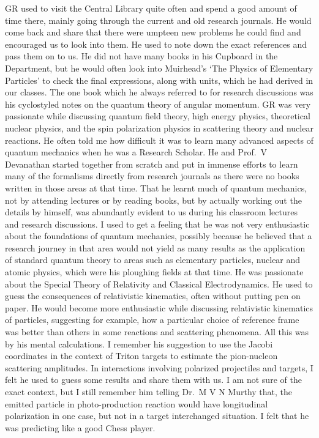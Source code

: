 GR used to visit the Central Library quite often and spend a good amount of time there, mainly going through the current and old research journals. He would come back and share that there were umpteen new problems he could find and encouraged us to look into them. He used to note down the exact references and pass them on to us. He did not have many books in his Cupboard in the Department, but he would often look into Muirhead's ‘The Physics of Elementary Particles' to check the final expressions, along with units, which he had derived in our classes. The one book which he always referred to for research discussions was his cyclostyled notes on the quantum theory of angular momentum. GR was very passionate while discussing quantum field theory, high energy physics, theoretical nuclear physics, and the spin polarization physics in scattering theory and nuclear reactions. He often told me how difficult it was to learn many advanced aspects of quantum mechanics when he was a Research Scholar. He and Prof.\ V Devanathan started together from scratch and put in immense efforts to learn many of the formalisms directly from research journals as there were no books written in those areas at that time. That he learnt much of quantum mechanics, not by attending lectures or by reading books, but by actually working out the details by himself, was abundantly evident to us during his classroom lectures and research discussions. I used to get a feeling that he was not very enthusiastic about the foundations of quantum mechanics, possibly because he believed that a research journey in that area would not yield as many results as the application of standard quantum theory to areas such as elementary particles, nuclear and atomic physics, which were his ploughing fields at that time. He was passionate about the Special Theory of Relativity and Classical Electrodynamics. He used to guess the consequences of relativistic kinematics, often without putting pen on paper. He would become more enthusiastic while discussing relativistic kinematics of particles, suggesting for example, how a particular choice of reference frame was better than others in some reactions and scattering phenomena. All this was by his mental calculations. I remember his suggestion to use the Jacobi coordinates in the context of Triton targets to estimate the pion-nucleon scattering amplitudes. In interactions involving polarized projectiles and targets, I felt he used to guess some results and share them with us. I am not sure of the exact context, but I still remember him telling Dr.\ M V N Murthy that, the emitted particle in photo-production reaction would have longitudinal polarization in one case, but not in a target interchanged situation. I felt that he was predicting like a good Chess player.

